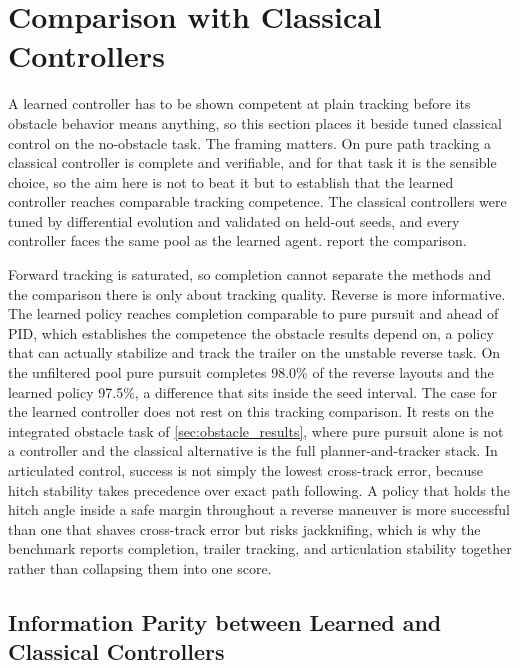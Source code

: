 \section{Comparison with Classical Controllers}
\label{sec:benchmark}

A learned controller has to be shown competent at plain tracking before its obstacle behavior means anything, so this section places it beside tuned classical control on the no-obstacle task. The framing matters. On pure path tracking a classical controller is complete and verifiable, and for that task it is the sensible choice, so the aim here is not to beat it but to establish that the learned controller reaches comparable tracking competence. The classical controllers were tuned by differential evolution and validated on held-out seeds, and every controller faces the same pool as the learned agent.  report the comparison.



Forward tracking is saturated, so completion cannot separate the methods and the comparison there is only about tracking quality. Reverse is more informative. The learned policy reaches completion comparable to pure pursuit and ahead of PID, which establishes the competence the obstacle results depend on, a policy that can actually stabilize and track the trailer on the unstable reverse task. On the unfiltered pool pure pursuit completes 98.0\% of the reverse layouts and the learned policy 97.5\%, a difference that sits inside the seed interval. The case for the learned controller does not rest on this tracking comparison. It rests on the integrated obstacle task of \cref{sec:obstacle_results}, where pure pursuit alone is not a controller and the classical alternative is the full planner-and-tracker stack. In articulated control, success is not simply the lowest cross-track error, because hitch stability takes precedence over exact path following. A policy that holds the hitch angle inside a safe margin throughout a reverse maneuver is more successful than one that shaves cross-track error but risks jackknifing, which is why the benchmark reports completion, trailer tracking, and articulation stability together rather than collapsing them into one score.

\subsection{Information Parity between Learned and Classical Controllers}
\label{sec:information_parity}

